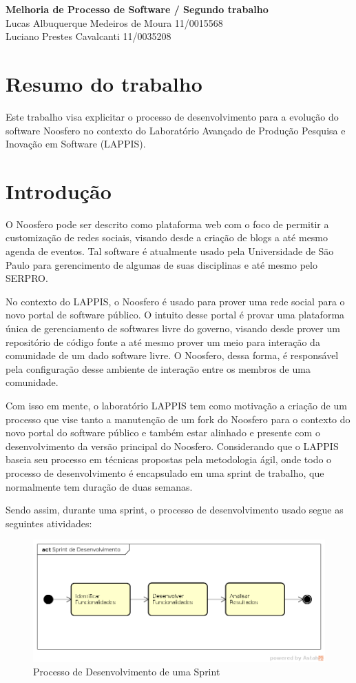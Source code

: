 \documentclass[a4paper, 11pt]{article}
\begin{document}
\noindent
\large\textbf{Melhoria de Processo de Software / Segundo trabalho}\\
Lucas Albuquerque Medeiros de Moura \hfill 11/0015568 \\
Luciano Prestes Cavalcanti \hfill 11/0035208

\section*{Resumo do trabalho}

Este trabalho visa explicitar o processo de desenvolvimento para a evolução do
software Noosfero no contexto do Laboratório Avançado de Produção Pesquisa e
Inovação em Software (LAPPIS).

\section*{Introdução}

O Noosfero pode ser descrito como plataforma web com o foco de permitir a
customização de redes sociais, visando desde a criação de blogs a até mesmo
agenda de eventos. Tal software é atualmente usado pela Universidade de São
Paulo para gerencimento de algumas de suas disciplinas e até mesmo pelo
SERPRO.

No contexto do LAPPIS, o Noosfero é usado para prover uma rede social para o
novo portal de software público. O intuito desse portal é provar uma
plataforma única de gerenciamento de softwares livre do governo, visando desde
prover um repositório de código fonte a até mesmo prover um meio para
interação da comunidade de um dado software livre. O Noosfero, dessa forma, é
responsável pela configuração desse ambiente de interação entre os membros de
uma comunidade.

Com isso em mente, o laboratório LAPPIS tem como motivação a criação de um
processo que vise tanto a manutenção de um fork do Noosfero para o contexto do
novo portal do software público e também estar alinhado e presente com o
desenvolvimento da versão principal do Noosfero. Considerando que o LAPPIS
baseia seu processo em técnicas propostas pela metodologia ágil, onde todo o
processo de desenvolvimento é encapsulado em uma sprint de trabalho, que
normalmente tem duração de duas semanas.

Sendo assim, durante uma sprint, o processo de desenvolvimento usado segue as
seguintes atividades:

\begin{figure}[ht!]
\centering
\includegraphics[width=150mm]{sprint_devel.png}
\caption{Processo de Desenvolvimento de uma Sprint \label{overflow}}
\end{figure}
\end{document}
